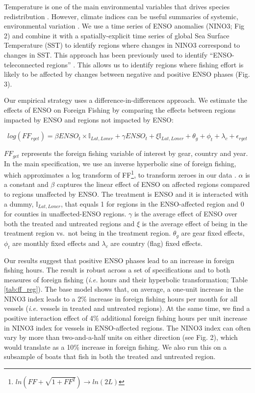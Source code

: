 \documentclass[]{article}
\let\rmarkdownfootnote\footnote%
\def\footnote{\protect\rmarkdownfootnote}
\begin{document}
Temperature is one of the main environmental variables that drives species redistribution \citep{pinsky_2013}. However, climate indices can be useful summaries of systemic, environmental variation \citep{meng_2016}. We use a time series of ENSO anomalies (NINO3; Fig 2) and combine it with a spatially-explicit time series of global Sea Surface Temperature (SST) to identify regions where changes in NINO3 correspond to changes in SST. This approach has been previously used to identify ``ENSO-teleconnected regions'' \citep{hsiang_2011}. This allows us to identify regions where fishing effort is likely to be affected by changes between negative and positive ENSO phases (Fig. 3).

Our empirical strategy uses a difference-in-differences approach. We estimate the effects of ENSO on Foreign Fishing by comparing the effects between regions impacted by ENSO and regions not impacted by ENSO:

\[
log(FF_{rgct}) = \beta ENSO_{t} \times \mathbb{I}_{Lat, Lon \epsilon r} + \gamma ENSO_{t} + \xi \mathbb{I}_{Lat, Lon \epsilon r} + \theta_{g} + \phi_{t} + \lambda_{c} + \epsilon_{rgct}
\]

\clearpage

\(FF_{gct}\) represents the foreign fishing variable of interest by gear, country and year. In the main specification, we use an inverse hyperbolic sine of foreign fishing, which approximates a log transform of FF\footnote{\(ln(FF + \sqrt{1 + FF^2}) \rightarrow ln(2L)\)}, to transform zeroes in our data \cite{Burbidge:1988, Card:2017}. \(\alpha\) is a constant and \(\beta\) captures the linear effect of ENSO on affected regions compared to regions unaffected by ENSO. The treatment is ENSO and it is interacted with a dummy, \(\mathbb{I}_{Lat, Lon \epsilon r}\), that equals 1 for regions in the ENSO-affected region and 0 for counties in unaffected-ENSO regions. \(\gamma\) is the average effect of ENSO over both the treated and untreated regions and \(\xi\) is the average effect of being in the treatment region vs.~not being in the treatment region. \(\theta_{g}\) are gear fixed effects, \(\phi_{t}\) are monthly fixed effects and \(\lambda_{c}\) are country (flag) fixed effects.

Our results suggest that positive ENSO phases lead to an increase in foreign fishing hours. The result is robust across a set of specifications and to both measures of foreign fishing (\emph{i.e.} hours and their hyperbolic transformation; Table \ref{tab:ff_reg}). The base model shows that, on average, a one-unit increase in the NINO3 index leads to a 2\% increase in foreign fishing hours per month for all vessels (\emph{i.e.} vessels in treated and untreated regions). At the same time, we find a positive interaction effect of 4\% additional foreign fishing hours per unit increase in NINO3 index for vessels in ENSO-affected regions. The NINO3 index can often vary by more than two-and-a-half units on either direction (see Fig. 2), which would translate as a 10\% increase in foreign fishing. We also run this on a subsample of boats that fish in both the treated and untreated region.
\end{document}
